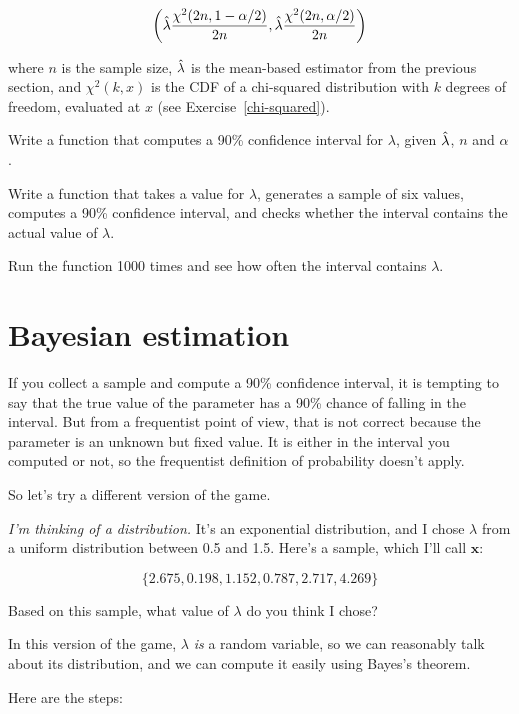 \documentclass[12pt]{book}
\begin{document}
\[ \left( \hat{\lambda} \frac{\chi^2(2n, 1-\alpha/2)}{2n},
      \hat{\lambda} \frac{\chi^2(2n, \alpha/2)}{2n} \right) \]

where $n$ is the sample size, $\hat{\lambda}$ is the mean-based estimator
from the previous section, and $\chi^2(k, x)$ is the CDF of a
chi-squared distribution with $k$ degrees of freedom, evaluated at $x$
(see Exercise~\ref{chi-squared}).

\begin{ex}
\label{expo_ci}

Write a function that computes a 90\% confidence interval for
$\lambda$, given $\hat{\lambda}$, $n$ and $\alpha$.

Write a function that takes a value for $\lambda$,
generates a sample of six values, computes a 90\% confidence interval,
and checks whether the interval contains the actual value of $\lambda$.

Run the function 1000 times and see how often the interval contains
$\lambda$.

\end{ex}


\section{Bayesian estimation}

If you collect a sample and compute a 90\% confidence interval, it is
tempting to say that the true value of the parameter has a 90\% chance
of falling in the interval.  But from a frequentist point of view,
that is not correct because the parameter is an unknown but fixed
value.  It is either in the interval you computed or not, so the
frequentist definition of probability doesn't apply.

So let's try a different version of the game.

\newcommand{\boldx}{\mathbf{x}}

{\em I'm thinking of a distribution.}  It's an exponential
distribution, and I chose $\lambda$ from a uniform distribution
between 0.5 and 1.5.  Here's a sample, which I'll call $\boldx$:

\[ \{ 2.675, 0.198, 1.152, 0.787, 2.717, 4.269 \} \]

Based on this sample, what value of $\lambda$ do you think I chose?

In this version of the game, $\lambda$ {\em is} a random variable, so we
can reasonably talk about its distribution, and we can compute it
easily using Bayes's theorem.

Here are the steps:
\end{document}
